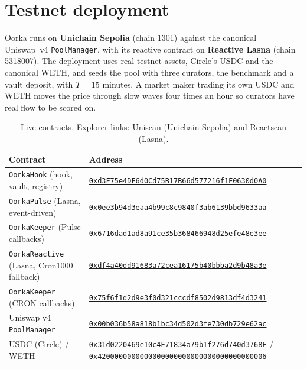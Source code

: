 \documentclass[11pt,a4paper]{article}
\newcommand{\code}[1]{\texttt{\small #1}}
\begin{document}
\section{Testnet deployment}\label{sec:deploy}
Oorka runs on \textbf{Unichain Sepolia} (chain 1301) against the canonical Uniswap~v4 \code{PoolManager}, with its reactive contract on \textbf{Reactive Lasna} (chain 5318007). The deployment uses real testnet assets, Circle's USDC and the canonical WETH, and seeds the pool with three curators, the benchmark and a vault deposit, with $T = 15$ minutes. A market maker trading its own USDC and WETH moves the price through slow waves four times an hour so curators have real flow to be scored on.

\begin{table}[H]
\centering\small
\begin{tabularx}{\linewidth}{@{}l X@{}}
\toprule
\textbf{Contract} & \textbf{Address} \\
\midrule
\code{OorkaHook} (hook, vault, registry) & \href{https://sepolia.uniscan.xyz/address/0xd3F75e4DF6d0Cd75B17B66d577216f1F0630d0A0}{\texttt{\footnotesize 0xd3F75e4DF6d0Cd75B17B66d577216f1F0630d0A0}} \\
\code{OorkaPulse} (Lasna, event-driven) & \href{https://lasna.reactscan.net/address/0x0ee3b94d3eaa4b99c8c9840f3ab6139bbd9633aa}{\texttt{\footnotesize 0x0ee3b94d3eaa4b99c8c9840f3ab6139bbd9633aa}} \\
\code{OorkaKeeper} (Pulse callbacks) & \href{https://sepolia.uniscan.xyz/address/0x6716dad1ad8a91ce35b368466948d25efe48e3ee}{\texttt{\footnotesize 0x6716dad1ad8a91ce35b368466948d25efe48e3ee}} \\
\code{OorkaReactive} (Lasna, Cron1000 fallback) & \href{https://lasna.reactscan.net/address/0xdf4a40dd91683a72cea16175b40bbba2d9b48a3e}{\texttt{\footnotesize 0xdf4a40dd91683a72cea16175b40bbba2d9b48a3e}} \\
\code{OorkaKeeper} (CRON callbacks) & \href{https://sepolia.uniscan.xyz/address/0x75f6f1d2d9e3f0d321cccdf8502d9813df4d3241}{\texttt{\footnotesize 0x75f6f1d2d9e3f0d321cccdf8502d9813df4d3241}} \\
Uniswap v4 \code{PoolManager} & \href{https://sepolia.uniscan.xyz/address/0x00b036b58a818b1bc34d502d3fe730db729e62ac}{\texttt{\footnotesize 0x00b036b58a818b1bc34d502d3fe730db729e62ac}} \\
USDC (Circle) / WETH & \texttt{\footnotesize 0x31d0220469e10c4E71834a79b1f276d740d3768F} / \texttt{\footnotesize 0x4200000000000000000000000000000000000006} \\
\bottomrule
\end{tabularx}
\caption{Live contracts. Explorer links: Uniscan (Unichain Sepolia) and Reactscan (Lasna).}
\label{tab:deploy}
\end{table}
\end{document}
